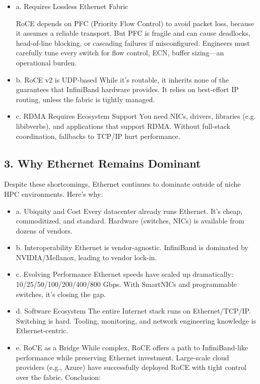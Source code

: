 \begin{itemize}
\item a. Requires Lossless Ethernet Fabric

RoCE depends on PFC (Priority Flow Control) to avoid packet loss, because it assumes a reliable transport.
But PFC is fragile and can cause deadlocks, head-of-line blocking, or cascading failures if misconfigured.
Engineers must carefully tune every switch for flow control, ECN, buffer sizing—an operational burden.

\item b. RoCE v2 is UDP-based
While it’s routable, it inherits none of the guarantees that InfiniBand hardware provides.
It relies on best-effort IP routing, unless the fabric is tightly managed.

\item c. RDMA Requires Ecosystem Support
You need NICs, drivers, libraries (e.g. libibverbs), and applications that support RDMA.
Without full-stack coordination, fallbacks to TCP/IP hurt performance.

\end{itemize}

\subsection{3. Why Ethernet Remains Dominant}

Despite these shortcomings, Ethernet continues to dominate outside of niche HPC environments. Here’s why:

\begin{itemize}
\item a. Ubiquity and Cost
Every datacenter already runs Ethernet. It’s cheap, commoditized, and standard.
Hardware (switches, NICs) is available from dozens of vendors.

\item b. Interoperability
Ethernet is vendor-agnostic. InfiniBand is dominated by NVIDIA/Mellanox, leading to vendor lock-in.

\item c. Evolving Performance
Ethernet speeds have scaled up dramatically: 10/25/50/100/200/400/800 Gbps.
With SmartNICs and programmable switches, it’s closing the gap.

\item d. Software Ecosystem
The entire Internet stack runs on Ethernet/TCP/IP. Switching is hard.
Tooling, monitoring, and network engineering knowledge is Ethernet-centric.

\item e. RoCE as a Bridge
While complex, RoCE offers a path to InfiniBand-like performance while preserving Ethernet investment.
Large-scale cloud providers (e.g., Azure) have successfully deployed RoCE with tight control over the fabric.
Conclusion:

\end{itemize}

